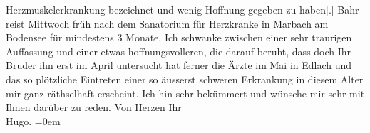 \begin{ledgroupsized}[t]{13cm}
               Herzmuskelerkrankung {\pb}bezeichnet
               und wenig Hoffnung gegeben zu haben{[}.{]}\pend
           \pstart
           Bahr reist Mittwoch früh nach dem Sanatorium für Herzkranke in Marbach am Bodensee
               für mindestens 3 Monate. Ich schwanke zwischen einer sehr traurigen Auffassung und
               einer etwas hoffnungsvolleren, die darauf beruht, dass doch Ihr Bruder ihn {\pb}erst im April
               untersucht hat ferner die Ärzte im Mai in Edlach und das so plötzliche Eintreten einer so äusserst schweren Erkrankung
               in diesem Alter mir ganz räthselhaft erscheint.\pend
           \pstart
           Ich hin sehr bekümmert und wünsche mir sehr mit Ihnen darüber zu reden. Von
               Herzen Ihr{\\[\baselineskip]}\spacefill\mbox{Hugo.}\pend
           \leftskip=0em{}
         
         \endnumbering{}\end{ledgroupsized}  \newcommand{\dateiname}{L01361}\newcommand{\titel}{Hugo von Hofmannsthal an Arthur Schnitzler, [8.–9. 1. 1904]}\newcommand{\editorInnen}{ Martin Anton Müller und Gerd-Hermann Susen}
      